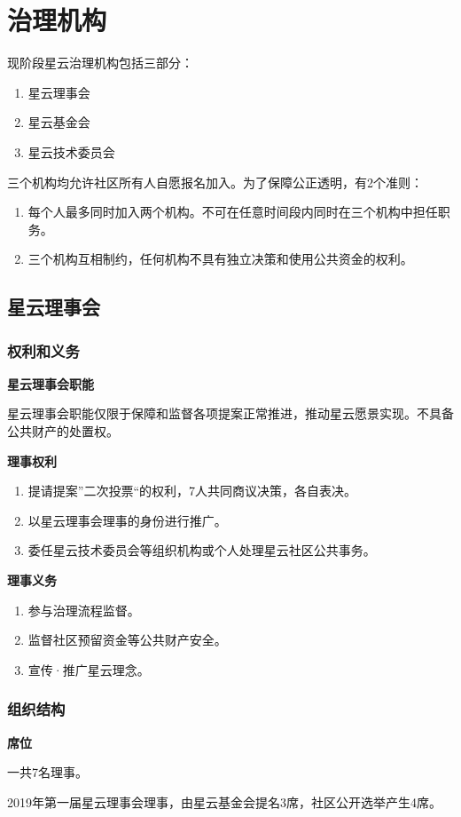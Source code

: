 \section{治理机构}
现阶段星云治理机构包括三部分：
\begin{enumerate}
	\item 星云理事会
	\item 星云基金会
	\item 星云技术委员会
\end{enumerate}
三个机构均允许社区所有人自愿报名加入。为了保障公正透明，有2个准则：
\begin{enumerate}
	\item 每个人最多同时加入两个机构。不可在任意时间段内同时在三个机构中担任职务。
	\item 三个机构互相制约，任何机构不具有独立决策和使用公共资金的权利。
\end{enumerate}
\subsection{星云理事会}
\subsubsection{权利和义务}
\textbf{星云理事会职能}

星云理事会职能仅限于保障和监督各项提案正常推进，推动星云愿景实现。不具备公共财产的处置权。

\textbf{理事权利}
\begin{enumerate}
	\item 提请提案”二次投票“的权利，7人共同商议决策，各自表决。
	\item 以星云理事会理事的身份进行推广。
	\item 委任星云技术委员会等组织机构或个人处理星云社区公共事务。
\end{enumerate}
\textbf{理事义务}
\begin{enumerate}
	\item 参与治理流程监督。
	\item 监督社区预留资金等公共财产安全。
	\item 宣传·推广星云理念。
\end{enumerate}
\subsubsection{组织结构}
\textbf{席位}

一共7名理事。

2019年第一届星云理事会理事，由星云基金会提名3席，社区公开选举产生4席。

